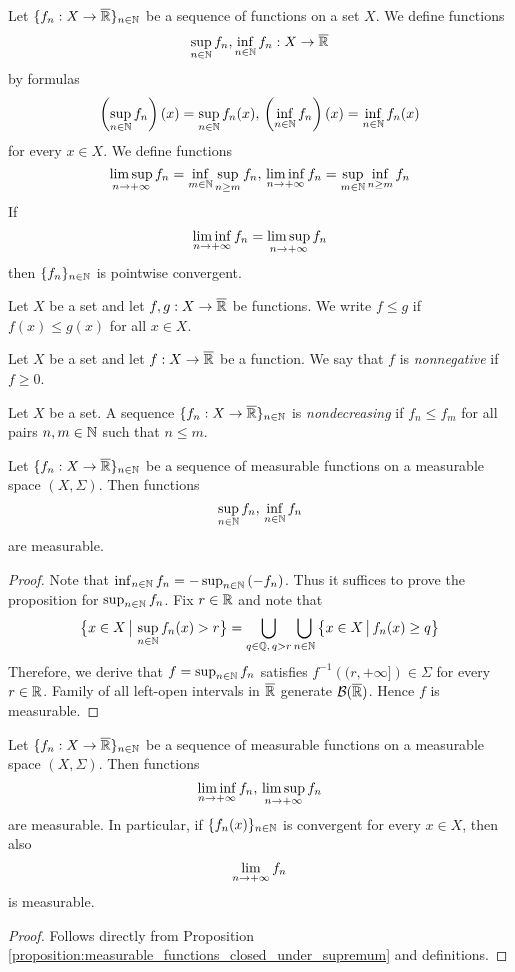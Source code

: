 Let $\{f_n:X\rightarrow \overline{{\mathbb R}}\}_{n\in {\mathbb N}}$ be a sequence of functions on a set $X$. We define functions
$$\sup_{n\in {\mathbb N}}f_n,\inf_{n\in {\mathbb N}}f_n:X\rightarrow \overline{{\mathbb R}}$$
by formulas
$$\left(\sup_{n\in {\mathbb N}}f_n\right)(x) = \sup_{n\in {\mathbb N}}f_n(x),\,\left(\inf_{n\in {\mathbb N}}f_n\right)(x) = \inf_{n\in {\mathbb N}}f_n(x)$$
for every $x\in X$. We define functions
$$\limsup_{n\rightarrow +\infty}f_n = \inf_{m\in {\mathbb N}}\sup_{n\geq m}f_n,\,\liminf_{n\rightarrow +\infty}f_n = \sup_{m\in {\mathbb N}}\inf_{n\geq m}f_n$$ 
If 
$$\liminf_{n\rightarrow +\infty}f_n = \limsup_{n\rightarrow +\infty}f_n$$
then $\{f_n\}_{n\in {\mathbb N}}$ is pointwise convergent.

Let $X$ be a set and let $f,g:X\rightarrow \overline{{\mathbb R}}$ be functions. We write $f \leq g$ if $f(x) \leq g(x)$ for all $x\in X$.

\begin{definition}
Let $X$ be a set and let $f:X\rightarrow \overline{{\mathbb R}}$ be a function. We say that $f$ is \textit{nonnegative} if $f \geq 0$.
\end{definition}

\begin{definition}
Let $X$ be a set. A sequence $\{f_n:X\rightarrow \overline{{\mathbb R}}\}_{n\in {\mathbb N}}$ is \textit{nondecreasing} if $f_n \leq f_m$ for all pairs $n, m\in {\mathbb N}$ such that $n\leq m$.
\end{definition}

\begin{proposition}\label{proposition:measurable_functions_closed_under_supremum}
Let $\{f_n:X\rightarrow \overline{{\mathbb R}}\}_{n\in {\mathbb N}}$ be a sequence of measurable functions on a measurable space $(X,\Sigma)$. Then functions
$$\sup_{n\in {\mathbb N}}f_n,\,\inf_{n\in {\mathbb N}}f_n$$
are measurable.
\end{proposition}
\begin{proof}
Note that $\inf_{n\in {\mathbb N}}f_n = -\sup_{n\in {\mathbb N}}\left(-f_n\right)$. Thus it suffices to prove the proposition for $\sup_{n\in {\mathbb N}}f_n$. Fix $r \in {\mathbb R}$ and note that
$$\big\{x\in X\,\big|\,\sup_{n\in {\mathbb N}}f_n(x) > r\big\} = \bigcup_{q\in {\mathbb Q},\,q > r}\bigcup_{n\in {\mathbb N}}\big\{x\in X\,\big|\,f_n(x) \geq q\big\}$$
Therefore, we derive that $f = \sup_{n\in {\mathbb N}}f_n$ satisfies $f^{-1}\left((r,+
\infty]\right)\in \Sigma$ for every $r \in {\mathbb R}$. Family of all left-open intervals in $\overline{{\mathbb R}}$ generate ${\mathcal B}(\overline{{\mathbb R}})$. Hence $f$ is measurable.
\end{proof}

\begin{corollary}\label{corollary:measurable_closed_under_limes_inferior}
Let $\{f_n:X\rightarrow \overline{{\mathbb R}}\}_{n\in {\mathbb N}}$ be a sequence of measurable functions on a measurable space $(X,\Sigma)$. Then functions
$$\liminf_{n \rightarrow +\infty}f_n,\,\limsup_{n\rightarrow +\infty}f_n$$
are measurable. In particular, if $\{f_n(x)\}_{n\in {\mathbb N}}$ is convergent for every $x\in X$, then also $$\lim_{n\rightarrow +\infty}f_n$$
is measurable.
\end{corollary}
\begin{proof}
Follows directly from Proposition \ref{proposition:measurable_functions_closed_under_supremum} and definitions.
\end{proof}

